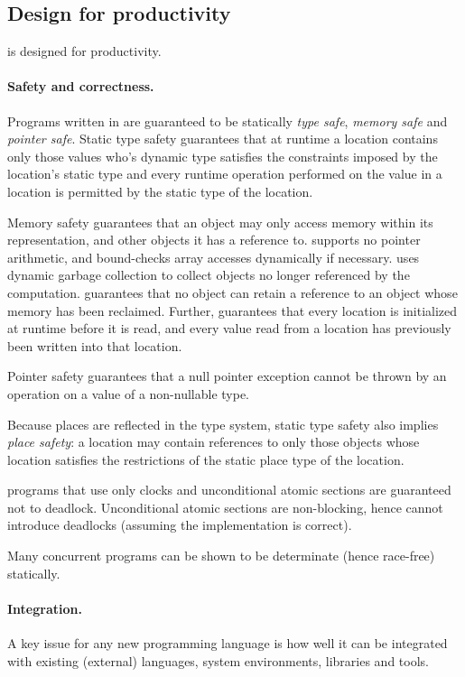 \subsection{Design for productivity}
\Xten{} is designed for productivity. 

\paragraph{Safety and correctness.} 
Programs written in \Xten{} are guaranteed to be statically {\em type
safe}, {\em memory safe} and {\em pointer safe}. Static type safety
guarantees that at runtime a location contains only those values who's
dynamic type satisfies the constraints imposed by the location's
static type and every runtime operation performed on the value in a
location is permitted by the static type of the location.

Memory safety guarantees that an object may only access memory within
its representation, and other objects it has a reference to. \Xten{}
supports no pointer arithmetic, and bound-checks array accesses
dynamically if necessary. \Xten{} uses dynamic garbage collection to
collect objects no longer referenced by the computation. \Xten{}
guarantees that no object can retain a reference to an object
whose memory has been reclaimed.  Further, \Xten{} guarantees that
every location is initialized at runtime before it is read, 
and every value read from a location has previously been written into
that location. 

Pointer safety guarantees that a null pointer exception cannot be
thrown by an operation on a value of a non-nullable type.

Because places are reflected in the type system, static type safety
also implies {\em place safety}: a location may contain references to only
those objects whose location satisfies the restrictions of the static
place type of the location.

\Xten{} programs that use only clocks and unconditional atomic
sections are guaranteed not to deadlock. Unconditional atomic sections
are non-blocking, hence cannot introduce deadlocks (assuming the
implementation is correct).

Many concurrent programs can be shown to be determinate (hence
race-free) statically.

\paragraph{Integration.}
A key issue for any new programming language is how well it can be
integrated with existing (external) languages, system environments,
libraries and tools.

